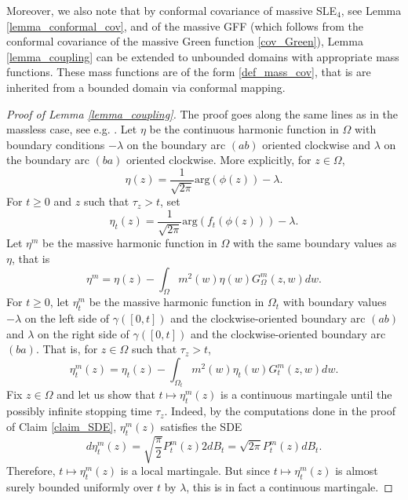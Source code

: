 \documentclass{article}
\theoremstyle{definition}
\theoremstyle{remark}
\theoremstyle{remark}
\begin{document}
Moreover, we also note that by conformal covariance of massive SLE$_4$, see Lemma \ref{lemma_conformal_cov}, and of the massive GFF (which follows from the conformal covariance of the massive Green function \eqref{cov_Green}), Lemma \ref{lemma_coupling} can be extended to unbounded domains with appropriate mass functions. These mass functions are of the form \eqref{def_mass_cov}, that is are inherited from a bounded domain via conformal mapping.

\begin{proof}[Proof of Lemma \ref{lemma_coupling}]
    The proof goes along the same lines as in the massless case, see e.g. \cite[Proposition~2.2.7]{Wu_level}. Let $\eta$ be the continuous harmonic function in $\Omega$ with boundary conditions $-\lambda$ on the boundary arc $(ab)$ oriented clockwise and $\lambda$ on the boundary arc $(ba)$ oriented clockwise. More explicitly, for $z \in \Omega$,
    \begin{equation*}
        \eta(z) = \frac{1}{\sqrt{2\pi}} \text{arg}(\phi(z)) - \lambda.
    \end{equation*}
    For $t \geq 0$ and $z$ such that $\tau_z > t$, set
    \begin{equation*}
        \eta_t(z) = \frac{1}{\sqrt{2\pi}} \text{arg}(f_t(\phi(z))) - \lambda. 
    \end{equation*}
    Let $\eta^{m}$ be the massive harmonic function in $\Omega$ with the same boundary values as $\eta$, that is
    \begin{equation*}
        \eta^{m} = \eta(z) - \int_{\Omega} m^2(w) \eta(w) G_{\Omega}^{m}(z,w) dw.
    \end{equation*}
    For $t \geq 0$, let $\eta_t^{m}$ be the massive harmonic function in $\Omega_t$ with boundary values $-\lambda$ on the left side of $\gamma([0,t])$ and the clockwise-oriented boundary arc $(ab)$ and $\lambda$ on the right side of $\gamma([0,t])$ and the clockwise-oriented boundary arc $(ba)$. That is, for $z \in \Omega$ such that $\tau_z > t$,
    \begin{equation*}
        \eta_t^{m}(z) = \eta_t(z) - \int_{\Omega_t} m^2(w) \eta_t(w) G_{t}^{m}(z,w) dw. 
    \end{equation*}
    Fix $z \in \Omega$ and let us show that $t \mapsto \eta_t^{m}(z)$ is a continuous martingale until the possibly infinite stopping time $\tau_z$. Indeed, by the computations done in the proof of Claim \ref{claim_SDE}, $\eta_t^{m}(z)$ satisfies the SDE
    \begin{equation} \label{SDE_mharm_GFF}
        d\eta_t^{m}(z) = \sqrt{\frac{\pi}{2}} P_t^{m}(z) 2dB_t = \sqrt{2\pi} P_t^m(z)dB_t.
    \end{equation}
    Therefore, $t \mapsto \eta_t^{m}(z)$ is a local martingale. But since $t \mapsto \eta_t^{m}(z)$ is almost surely bounded uniformly over $t$ by $\lambda$, this is in fact a continuous martingale. 
    

\end{proof}
\end{document}
